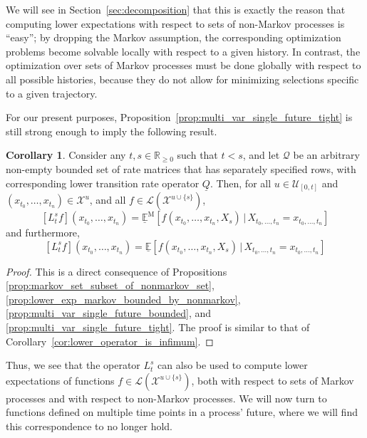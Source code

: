 \documentclass[10pt]{paper}
\theoremstyle{definition}
\newtheorem{proposition}[theorem]{Proposition}
\newtheorem{corollary}[theorem]{Corollary}
\newcommand{\reals}{\mathbb{R}}
\newcommand{\realspos}{\reals_{>0}}
\newcommand{\realsnonneg}{\reals_{\geq 0}}
\newcommand{\states}{\mathcal{X}}
\newcommand{\processes}{\mathbb{P}}
\newcommand{\mprocesses}{\processes^{\mathrm{M}}}
\newcommand{\gambles}{\mathcal{L}}
\newcommand{\rateset}{\mathcal{Q}}
\newcommand{\lrate}{\underline{Q}}
\newcommand{\norm}[1]{\left\lVert #1 \right\rVert}
\begin{document}
We will see in Section~\ref{sec:decomposition} that this is exactly the reason that computing lower expectations with respect to sets of non-Markov processes is ``easy''; by dropping the Markov assumption, the corresponding optimization problems become solvable locally with respect to a given history. In contrast, the optimization over sets of Markov processes must be done globally with respect to all possible histories, because they do not allow for minimizing selections specific to a given trajectory.

For our present purposes, Proposition~\ref{prop:multi_var_single_future_tight} is still strong enough to imply the following result.


\begin{corollary}
Consider any $t,s\in\realsnonneg$ such that $t<s$, and let $\rateset$ be an arbitrary non-empty bounded set of rate matrices that has separately specified rows, with corresponding lower transition rate operator $\lrate$. Then, for all $u\in\mathcal{U}_{[0,t]}$ and $(x_{t_0},\ldots,x_{t_n})\in\states^u$, and all $f\in\gambles(\states^{u\cup\{s\}})$,
\begin{equation*}
\left[L_t^s f\right](x_{t_0},\ldots,x_{t_n}) = \underline{\mathbb{E}}^{\mathrm{M}}[f(x_{t_0},\ldots,x_{t_n},X_s)\,\vert\,X_{t_0,\ldots,t_n}=x_{t_0,\ldots,t_n}]
\end{equation*}
and furthermore,
\begin{equation*}
\left[L_t^s f\right](x_{t_0},\ldots,x_{t_n}) = \underline{\mathbb{E}}[f(x_{t_0},\ldots,x_{t_n},X_s)\,\vert\,X_{t_0,\ldots,t_n}=x_{t_0,\ldots,t_n}]
\end{equation*}
\end{corollary}
\begin{proof}
This is a direct consequence of Propositions \ref{prop:markov_set_subset_of_nonmarkov_set}, \ref{prop:lower_exp_markov_bounded_by_nonmarkov}, \ref{prop:multi_var_single_future_bounded}, and \ref{prop:multi_var_single_future_tight}. The proof is similar to that of Corollary~\ref{cor:lower_operator_is_infimum}.
\end{proof}
Thus, we see that the operator $L_t^s$ can also be used to compute lower expectations of functions $f\in\gambles(\states^{u\cup\{s\}})$, both with respect to sets of Markov processes and with respect to non-Markov processes. We will now turn to functions defined on multiple time points in a process' future, where we will find this correspondence to no longer hold.
\end{document}
